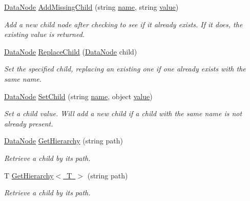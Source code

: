 \begin{DoxyCompactItemize}
\mbox{\hyperlink{class_t_net_1_1_data_node}{Data\+Node}} \mbox{\hyperlink{class_t_net_1_1_data_node_a746ea0c61bbba5fadf93038b4becffce}{Add\+Missing\+Child}} (string \mbox{\hyperlink{class_t_net_1_1_data_node_aaf44a44fb25aad98dd115faf7607858c}{name}}, string \mbox{\hyperlink{class_t_net_1_1_data_node_ab1b718ef512ce7e5ebff5aa1a6c8e37b}{value}})
\begin{DoxyCompactList}\small\item\em Add a new child node after checking to see if it already exists. If it does, the existing value is returned. \end{DoxyCompactList}\item 
\mbox{\hyperlink{class_t_net_1_1_data_node}{Data\+Node}} \mbox{\hyperlink{class_t_net_1_1_data_node_ae0cc7801b9ce856d64025fd5fd758e6b}{Replace\+Child}} (\mbox{\hyperlink{class_t_net_1_1_data_node}{Data\+Node}} child)
\begin{DoxyCompactList}\small\item\em Set the specified child, replacing an existing one if one already exists with the same name. \end{DoxyCompactList}\item 
\mbox{\hyperlink{class_t_net_1_1_data_node}{Data\+Node}} \mbox{\hyperlink{class_t_net_1_1_data_node_a952008873fb2317d354d1eb5e5ef66e4}{Set\+Child}} (string \mbox{\hyperlink{class_t_net_1_1_data_node_aaf44a44fb25aad98dd115faf7607858c}{name}}, object \mbox{\hyperlink{class_t_net_1_1_data_node_ab1b718ef512ce7e5ebff5aa1a6c8e37b}{value}})
\begin{DoxyCompactList}\small\item\em Set a child value. Will add a new child if a child with the same name is not already present. \end{DoxyCompactList}\item 
\mbox{\hyperlink{class_t_net_1_1_data_node}{Data\+Node}} \mbox{\hyperlink{class_t_net_1_1_data_node_afc1fb219f0560f952f36a13f004b50b1}{Get\+Hierarchy}} (string path)
\begin{DoxyCompactList}\small\item\em Retrieve a child by its path. \end{DoxyCompactList}\item 
T \mbox{\hyperlink{class_t_net_1_1_data_node_a19317391ffe961fd72efb77da1d0df79}{Get\+Hierarchy$<$ T $>$}} (string path)
\begin{DoxyCompactList}\small\item\em Retrieve a child by its path. \end{DoxyCompactList}\item 

\end{DoxyCompactItemize}
